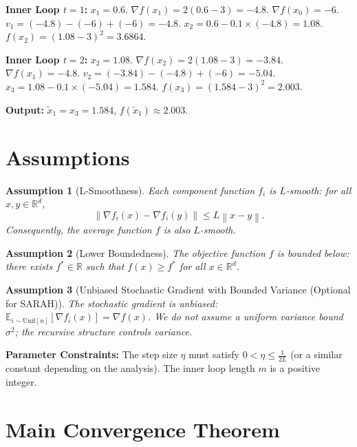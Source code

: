 \documentclass{article}
\newtheorem{assumption}{Assumption}
\newcommand{\R}{\mathbb{R}}
\newcommand{\E}{\mathbb{E}}
\newcommand{\norm}[1]{\left\| #1 \right\|}
\newcommand{\grad}{\nabla}
\begin{document}
\textbf{Inner Loop $t=1$:}
$x_1 = 0.6$.
$\grad f(x_1) = 2(0.6-3) = -4.8$.
$\grad f(x_0) = -6$.
$v_1 = (-4.8) - (-6) + (-6) = -4.8$.
$x_2 = 0.6 - 0.1 \times (-4.8) = 1.08$.
$f(x_2) = (1.08-3)^2 = 3.6864$.

\textbf{Inner Loop $t=2$:}
$x_2 = 1.08$.
$\grad f(x_2) = 2(1.08-3) = -3.84$.
$\grad f(x_1) = -4.8$.
$v_2 = (-3.84) - (-4.8) + (-6) = -5.04$.
$x_3 = 1.08 - 0.1 \times (-5.04) = 1.584$.
$f(x_3) = (1.584-3)^2 = 2.003$.

\textbf{Output:} $\tilde{x}_1 = x_3 = 1.584$, $f(\tilde{x}_1) \approx 2.003$.

\section*{Assumptions}

\begin{assumption}[L-Smoothness]
\label{assump:smooth}
Each component function $f_i$ is $L$-smooth: for all $x, y \in \R^d$,
\begin{equation}
    \norm{\grad f_i(x) - \grad f_i(y)} \le L \norm{x - y}.
\end{equation}
Consequently, the average function $f$ is also $L$-smooth.
\end{assumption}

\begin{assumption}[Lower Boundedness]
\label{assump:bounded}
The objective function $f$ is bounded below: there exists $f^* \in \R$ such that $f(x) \ge f^*$ for all $x \in \R^d$.
\end{assumption}

\begin{assumption}[Unbiased Stochastic Gradient with Bounded Variance (Optional for SARAH)]
\label{assump:variance}
The stochastic gradient is unbiased: $\E_{i \sim \text{Unif}[n]}[\grad f_i(x)] = \grad f(x)$.
We do not assume a uniform variance bound $\sigma^2$; the recursive structure controls variance.
\end{assumption}

\textbf{Parameter Constraints:} The step size $\eta$ must satisfy $0 < \eta \le \frac{1}{2L}$ (or a similar constant depending on the analysis). The inner loop length $m$ is a positive integer.

\section*{Main Convergence Theorem}
\end{document}
